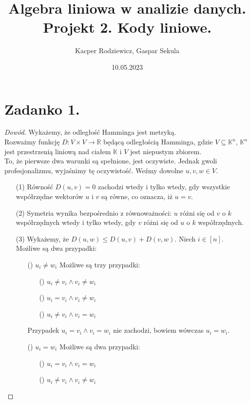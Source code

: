 \documentclass[10pt]{article} %
\title{Algebra liniowa w analizie danych. Projekt 2. Kody liniowe.}
\author{Kacper Rodziewicz, Gaspar Sekula}
\date{10.05.2023}
\begin{document}
\maketitle


\section*{Zadanko 1.}
\begin{proof}[Dowód] 
Wykażemy, że odległość Hamminga jest metryką.\\
Rozważmy funkcję $D: V \times V \rightarrow \mathbb{R}$ będącą odległością Hamminga, gdzie $V \subseteq \mathbb{K}^n$, $ \mathbb{K}^n$ jest przestrzenią liniową nad ciałem $\mathbb{K}$ i $V$ jest niepustym zbiorem.\\
To, że pierwsze dwa warunki są spełnione, jest oczywiste. Jednak gwoli profesjonalizmu, wyjaśnimy tę oczywistość. Weźmy dowolne $u, v, w \in V$. \\
\begin{enumerate}
\item[(1)] Równość $D(u, v) = 0$ zachodzi wtedy i tylko wtedy, gdy wszystkie współrzędne wektorów $u$ i $v$ są równe, co oznacza, iż $u=v$.
\item[(2)] Symetria wynika bezpośrednio z równoważności: $u$ różni się od $v$ o $k$ współrzędnych wtedy i tylko wtedy, gdy $v$ różni się od $u$ o $k$ współrzędnych.
\item[(3)] Wykażemy, że $D(u,w) \leq D(u,v) +D(v,w)$. Niech $i \in [n]$. Możliwe są dwa przypadki:
\begin{enumerate}
\item[(\faCrow)] $u_i \neq w_i$ Możliwe są trzy przypadki:
\begin{enumerate}
\item[(\faDiceOne)] $u_i \neq v_i \wedge v_i \neq w_i$
\item[(\faDiceTwo)]  $u_i = v_i \wedge v_i \neq w_i$
\item[(\faDiceThree)]  $u_i \neq v_i \wedge v_i = w_i$
\end{enumerate}
Przypadek  $u_i = v_i \wedge v_i = w_i$ nie zachodzi, bowiem wówczas $u_i = w_i$.
\item[(\faBone)] $u_i = w_i$ Możliwe są dwa przypadki:
\begin{enumerate}
\item[(\faDiceOne)] $u_i = v_i \wedge v_i = w_i$
\item[(\faDiceTwo)]  $u_i \neq v_i \wedge v_i \neq w_i$

\end{enumerate}
\end{enumerate}
\end{enumerate}
\end{proof}
\end{document}
